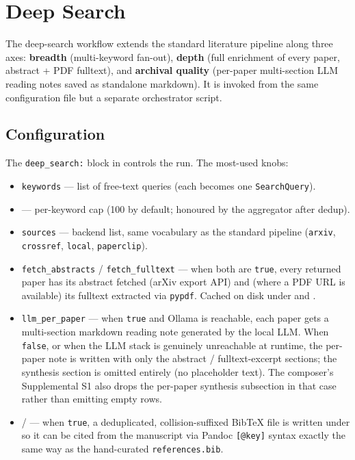 \documentclass[
]{article}
\providecommand{\tightlist}{%
  \setlength{\itemsep}{0pt}\setlength{\parskip}{0pt}}
\begin{document}
\newpage

\section{Deep Search}\label{sec:deep_search}

The deep-search workflow extends the standard literature pipeline along
three axes: \textbf{breadth} (multi-keyword fan-out), \textbf{depth}
(full enrichment of every paper, abstract + PDF fulltext), and
\textbf{archival quality} (per-paper multi-section LLM reading notes
saved as standalone markdown). It is invoked from the same configuration
file but a separate orchestrator script.

\subsection{Configuration}\label{configuration}

The \texttt{deep\_search:} block in 
controls the run. The most-used knobs:

\begin{itemize}
\tightlist
\item
  \texttt{keywords} --- list of free-text queries (each becomes one
  \texttt{SearchQuery}).
\item
   --- per-keyword cap (100 by
  default; honoured by the aggregator after dedup).
\item
  \texttt{sources} --- backend list, same vocabulary as the standard
  pipeline (\texttt{arxiv}, \texttt{crossref}, \texttt{local},
  \texttt{paperclip}).
\item
  \texttt{fetch\_abstracts} / \texttt{fetch\_fulltext} --- when both are
  \texttt{true}, every returned paper has its abstract fetched (arXiv
  export API) and (where a PDF URL is available) its fulltext extracted
  via \texttt{pypdf}. Cached on disk under 
  and .
\item
  \texttt{llm\_per\_paper} --- when \texttt{true} and Ollama is
  reachable, each paper gets a multi-section markdown reading note
  generated by the local LLM. When \texttt{false}, or when the LLM stack
  is genuinely unreachable at runtime, the per-paper note is written
  with only the abstract / fulltext-excerpt sections; the synthesis
  section is omitted entirely (no placeholder text). The composer's
  Supplemental S1 also drops the per-paper synthesis subsection in that
  case rather than emitting empty rows.
\item
   /  ---
  when \texttt{true}, a deduplicated, collision-suffixed BibTeX file is
  written under  so it can be
  cited from the manuscript via Pandoc \texttt{{[}@key{]}} syntax
  exactly the same way as the hand-curated \texttt{references.bib}.
\end{itemize}
\end{document}
